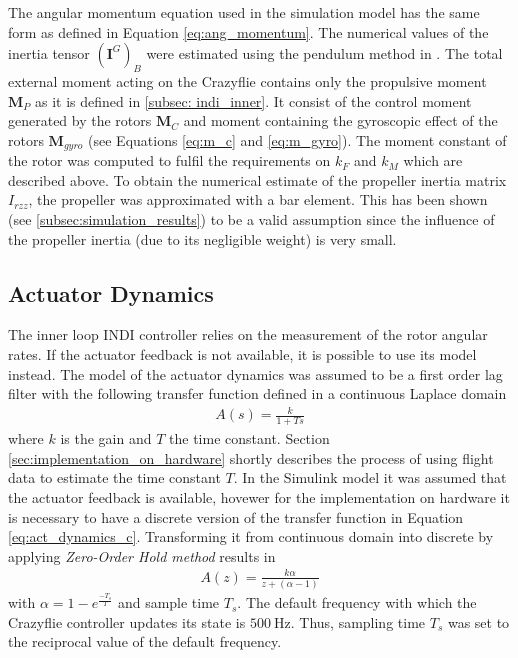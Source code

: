 \documentclass[11pt, a4paper, twoside]{report}
\begin{document}
The angular momentum equation used in the simulation model has the same form as defined in Equation \ref{eq:ang_momentum}. The numerical values of the inertia tensor $(\bm{I}^G)_B$ were estimated using the pendulum method in \cite{foerster}. The total external moment acting on the Crazyflie contains only the propulsive moment $\bm{M}_P$ as it is defined in \ref{subsec: indi_inner}. It consist of the control moment generated by the rotors $\bm{M}_C$  and moment containing the gyroscopic effect of the rotors $\bm{M}_{gyro}$ (see Equations \ref{eq:m_c} and \ref{eq:m_gyro}). The moment constant of the rotor was computed to fulfil the requirements on $k_F$ and $k_M$ which are described above. To obtain the numerical estimate of the propeller inertia matrix $I_{rzz}$, the propeller was approximated with a bar element. This has been shown (see \ref{subsec:simulation_results}) to be a valid assumption since the influence of the propeller inertia (due to its negligible weight) is very small.

\subsection{Actuator Dynamics} \label{subsec:actuator_dynamics}

The inner loop \acrshort{INDI} controller relies on the measurement of the rotor angular rates. If the actuator feedback is not available, it is possible to use its model instead. The model of the actuator dynamics was assumed to be a first order lag filter with the following transfer function defined in a continuous Laplace domain
\begin{equation}
	\begin{split}
		A(s) = \frac{k}{1+Ts}
		\label{eq:act_dynamics_c}
	\end{split}
\end{equation}
where $k$ is the gain and $T$ the time constant. Section \ref{sec:implementation_on_hardware} shortly describes the process of using flight data to estimate the time constant $T$. In the Simulink model it was assumed that the actuator feedback is available, hovewer for the implementation on hardware it is necessary to have a discrete version of the transfer function in Equation \ref{eq:act_dynamics_c}. Transforming it from continuous domain into discrete by applying \textit{Zero-Order Hold method} results in
\begin{equation}
	\begin{split}
		A(z) = \frac{k\alpha}{z+(\alpha-1)}
		\label{eq:act_dynamics_d}
	\end{split}
\end{equation}
with $\alpha = 1-e^{\frac{-T_s}{T}}$ and sample time $T_s$. The default frequency with which the Crazyflie controller updates its state is $500~\si{\Hz}$. Thus, sampling time $T_s$ was set to the reciprocal value of the default frequency. 
\end{document}
